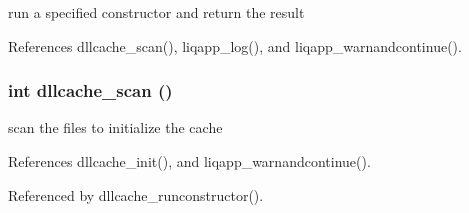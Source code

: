 run a specified constructor and return the result 

References dllcache\_\-scan(), liqapp\_\-log(), and liqapp\_\-warnandcontinue().
\subsubsection[{dllcache\_\-scan}]{\setlength{\rightskip}{0pt plus 5cm}int dllcache\_\-scan ()}\label{d4/d58/liqcell__dllcache_8c_50392c622912cbad6183fb44eb771f99}


scan the files to initialize the cache 

References dllcache\_\-init(), and liqapp\_\-warnandcontinue().

Referenced by dllcache\_\-runconstructor().